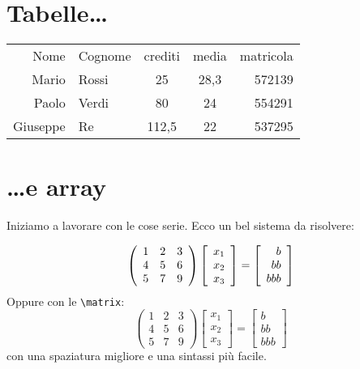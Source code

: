 \section{Tabelle\dots}

\begin{tabular}{rlccr} %
    \toprule
        Nome & Cognome & crediti & media & matricola \\
    \cmidrule(r){1-2}
    \cmidrule(rl){3-4}
    \cmidrule(l){5-5}
        Mario & Rossi & 25 & 28,3 & 572139 \\
        Paolo & Verdi & 80 & 24 & 554291 \\
        Giuseppe & Re & 112,5 & 22 & 537295 \\
    \bottomrule
\end{tabular}

\section{\dots e array}

Iniziamo a lavorare con le cose serie. Ecco un bel sistema da risolvere:

\[
  \left(
  \begin{array}{c c c}
    1 & 2 & 3 \\
    4 & 5 & 6 \\
    5 & 7 & 9
  \end{array}
  \right) \left[
  \begin{array}{l}
    x_1 \\ x_2 \\ x_3
  \end{array}
  \right] = \left[
  \begin{array}{r}
    b \\ bb \\ bbb
  \end{array}
  \right]
\]
Oppure con le \verb|\matrix|:
\[
  \begin{pmatrix}
    1 & 2 & 3 \\
    4 & 5 & 6 \\
    5 & 7 & 9
  \end{pmatrix}
  \begin{bmatrix}
    x_1 \\ x_2 \\ x_3
  \end{bmatrix}
  =
  \begin{bmatrix}
    b \\ bb \\ bbb
  \end{bmatrix}
\]
con una spaziatura migliore e una sintassi più facile.
